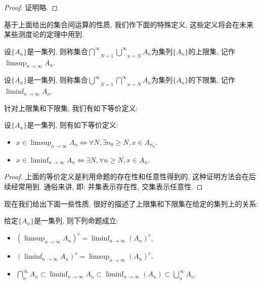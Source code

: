 \documentclass[theorem=false,mathfont=none,openany,sub3section]{easybook}
\begin{document}
\begin{proof}
  证明略.
\end{proof}

基于上面给出的集合间运算的性质, 我们作下面的特殊定义, 这些定义将会在未来某些测度论的定理中用到.\par
\begin{definition}
  设$\{A_n\}$是一集列, 则称集合$\underset{N=1}{\overset{\infty}{\bigcap}}\underset{n=N}{\overset{\infty}{\bigcup}}A_n$为集列$\{A_n\}$的上限集, 记作$\limsup_{n \to \infty}A_n$.\par
  设$\{A_n\}$是一集列, 则称集合$\underset{N=1}{\overset{\infty}{\bigcup}}\underset{n=N}{\overset{\infty}{\bigcap}}A_n$为集列$\{A_n\}$的下限集, 记作$\liminf_{n \to \infty}A_n$.\par
\end{definition}

针对上限集和下限集, 我们有如下等价定义:\par
\begin{theorem}
  设$\{A_n\}$是一集列, 则有如下等价定义:\par
  \begin{itemize}
    \item $x\in \limsup_{n \to \infty}A_n\Leftrightarrow \forall N, \exists n_0\geqslant N, x\in A_{n_0}$.
    \item $x\in \liminf_{n \to \infty}A_n\Leftrightarrow \exists N, \forall n\geqslant N, x\in A_{n}$.
  \end{itemize}
\end{theorem}
\begin{proof}
  上面的等价定义是利用命题的存在性和任意性得到的, 这种证明方法会在后续经常用到. 通俗来讲, 即: 并集表示存在性, 交集表示任意性.\par
\end{proof}

现在我们给出下面一些性质, 很好的描述了上限集和下限集在给定的集列上的关系:\par
\begin{theorem}
  给定$\{A_n\}$是一集列, 则下列命题成立:\par
  \begin{itemize}
    \item $(\limsup_{n \to \infty}A_n)^{c}=\liminf_{n \to \infty}(A_n)^{c}$.
    \item $(\liminf_{n \to \infty}A_n)^{c}=\limsup_{n \to \infty}(A_n)^{c}$.
    \item $\bigcap_{n}^{\infty}A_n \subset \liminf_{n \to \infty}A_n\subset \liminf_{n \to \infty}(A_n)\subset \bigcup_{n}^{\infty}A_n$.
  \end{itemize}
\end{theorem}
\end{document}
